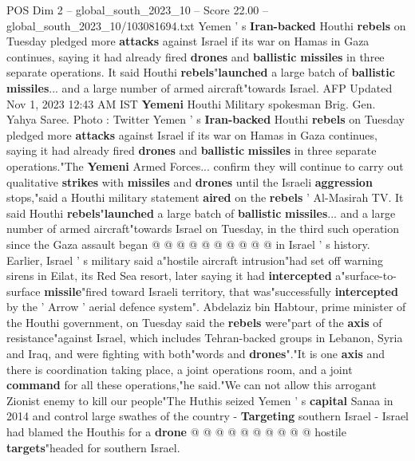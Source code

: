 \begin{textsample}{POS Dim 2 – global\_south\_2023\_10 – Score 22.00 – global\_south\_2023\_10/103081694.txt}  \label{ex:f2_pos_056}
Yemen ' s \textbf{Iran-backed} Houthi \textbf{rebels} on Tuesday pledged more \textbf{attacks} against Israel if its war on Hamas in Gaza continues, saying it had already fired \textbf{drones} and \textbf{ballistic} \textbf{missiles} in three separate operations.
It said Houthi \textbf{rebels}"\textbf{launched} a large batch of \textbf{ballistic} \textbf{missiles}... and a large number of armed aircraft"towards Israel.
AFP Updated Nov 1, 2023 12:43 AM IST \textbf{Yemeni} Houthi Military spokesman Brig.
Gen.
Yahya Saree.
Photo : Twitter Yemen ' s \textbf{Iran-backed} Houthi \textbf{rebels} on Tuesday pledged more \textbf{attacks} against Israel if its war on Hamas in Gaza continues, saying it had already fired \textbf{drones} and \textbf{ballistic} \textbf{missiles} in three separate operations."The \textbf{Yemeni} Armed Forces... confirm they will continue to carry out qualitative \textbf{strikes} with \textbf{missiles} and \textbf{drones} until the Israeli \textbf{aggression} stops,"said a Houthi military statement \textbf{aired} on the \textbf{rebels} ' Al-Masirah TV.
It said Houthi \textbf{rebels}"\textbf{launched} a large batch of \textbf{ballistic} \textbf{missiles}... and a large number of armed aircraft"towards Israel on Tuesday, in the third such operation since the Gaza assault began @ @ @ @ @ @ @ @ @ @ in Israel ' s history.
Earlier, Israel ' s military said a"hostile aircraft intrusion"had set off warning sirens in Eilat, its Red Sea resort, later saying it had \textbf{intercepted} a"surface-to-surface \textbf{missile}"fired toward Israeli territory, that was"successfully \textbf{intercepted} by the ' Arrow ' aerial defence system".
Abdelaziz bin Habtour, prime minister of the Houthi government, on Tuesday said the \textbf{rebels} were"part of the \textbf{axis} of resistance"against Israel, which includes Tehran-backed groups in Lebanon, Syria and Iraq, and were fighting with both"words and \textbf{drones}"."It is one \textbf{axis} and there is coordination taking place, a joint operations room, and a joint \textbf{command} for all these operations,"he said."We can not allow this arrogant Zionist enemy to kill our people"The Huthis seized Yemen ' s \textbf{capital} Sanaa in 2014 and control large swathes of the country - \textbf{Targeting} southern Israel - Israel had blamed the Houthis for a \textbf{drone} @ @ @ @ @ @ @ @ @ @ hostile \textbf{targets}"headed for southern Israel.

\end{textsample}
